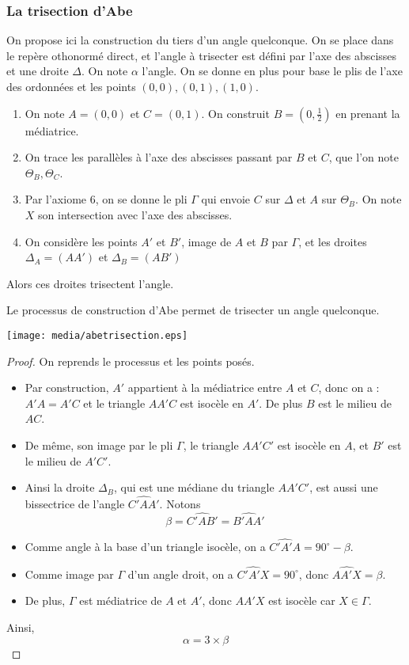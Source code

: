 \documentclass[a4paper,12pt,french]{report}
\begin{document}
		\subsubsection{La trisection d'Abe}
		On propose ici la construction du tiers d'un angle quelconque. On se place dans le repère othonormé direct, et l'angle à trisecter est défini par l'axe des abscisses et une droite $\Delta$. On note $\alpha$ l'angle. On se donne en plus pour base le plis de l'axe des ordonnées et les points $(0,0),(0,1),(1,0)$.
		\begin{enumerate}
			\item On note $A = (0,0)$ et $C = (0,1)$. On construit $B = (0,\frac{1}{2})$ en prenant la médiatrice.
			\item On trace les parallèles à l'axe des abscisses passant par $B$ et $C$, que l'on note $\Theta_{B},\Theta_{C}$.
			\item Par l'axiome 6, on se donne le pli $\Gamma$ qui envoie $C$ sur $\Delta$ et $A$ sur $\Theta_{B}$. On note $X$ son intersection avec l'axe des abscisses.
			\item On considère les points $A'$ et $B'$, image de $A$ et $B$ par $\Gamma$, et les droites $\Delta_{A} = (AA')$ et $\Delta_{B} = (AB')$
		\end{enumerate}
		Alors ces droites trisectent l'angle.
		
		\begin{theorem}
			Le processus de construction d'Abe permet de trisecter un angle quelconque.
		\end{theorem}
		
		
			\begin{center}
				\texttt{[image: media/abetrisection.eps]}
			\end{center}
		
		\begin{proof}
			On reprends le processus et les points posés.
			\begin{itemize}
				\item Par construction, $A'$ appartient à la médiatrice entre $A$ et $C$, donc on a :
				\(
					A'A = A'C
				\)
				 et le triangle $AA'C$ est isocèle en $A'$. De plus $B$ est le milieu de $AC$.
				\item De même, son image par le pli $\Gamma$, le triangle $AA'C'$ est isocèle en $A$, et $B'$ est le milieu de $A'C'$. 
				\item Ainsi la droite $\Delta_{B}$, qui est une médiane du triangle $AA'C'$, est aussi une bissectrice de l'angle $\widehat{C'AA'}$. Notons \[\beta = \widehat{C'AB'} = \widehat{B'AA'}\]
				\item Comme angle à la base d'un triangle isocèle, on a $\widehat{C'A'A} = 90^{\circ} - \beta $.
				\item Comme image par $\Gamma$ d'un angle droit, on a $\widehat{C'A'X} = 90^{\circ}$, donc $\widehat{AA'X} = \beta$. 
				\item De plus, $\Gamma$ est médiatrice de $A$ et $A'$, donc $AA'X$ est isocèle car $X\in\Gamma$.
			\end{itemize}
			Ainsi, 
			\[{}
			\alpha = 3 \times \beta{}
			\]
		\end{proof}
		
\end{document}
